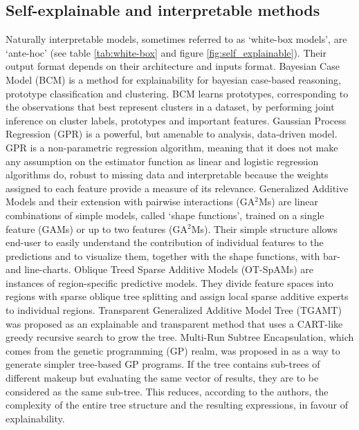 \documentclass[final,1p,times]{elsarticle}
\begin{document}
\subsection{Self-explainable and interpretable methods}
Naturally interpretable models, sometimes referred to as `white-box models', are `ante-hoc' (see table \ref{tab:white-box} and figure \ref{fig:self_explainable}). Their output format depends on their architecture and inputs format.
Bayesian Case Model (BCM) \cite{kim2014bayesian} is a method for explainability for bayesian case-based reasoning, prototype classification and clustering. BCM learns prototypes, corresponding to the observations that best represent clusters in a dataset, by performing joint inference on cluster labels, prototypes and important features.
Gaussian Process Regression (GPR) \cite{caywood2017gaussian} is a powerful, but amenable to analysis, data-driven model. GPR is a non-parametric regression algorithm, meaning that it does not make any assumption on the estimator function as linear and logistic regression algorithms do, robust to missing data and interpretable because the weights assigned to each feature provide a measure of its relevance.
Generalized Additive Models \cite{lou2012intelligible} and their extension with pairwise interactions (GA$^2$Ms) \cite{caruana2015intelligible, lou2013accurate} are linear combinations of simple models, called `shape functions', trained on a single feature (GAMs) or up to two features (GA$^2$Ms). Their simple structure allows end-user to easily understand the contribution of individual features to the predictions and to visualize them, together with the shape functions, with bar- and line-charts.
Oblique Treed Sparse Additive Models (OT-SpAMs) \cite{wang2015trading} are instances of region-specific predictive models. They divide feature spaces into regions with sparse oblique tree splitting and assign local sparse additive experts to individual regions. Transparent Generalized Additive Model Tree (TGAMT) \cite{fahner2018developing} was proposed as an explainable and transparent method that uses a CART-like greedy recursive search to grow the tree.
Multi-Run Subtree Encapsulation, which comes from the genetic programming (GP) realm, was proposed in \cite{howard2018explainable} as a way to generate simpler tree-based GP programs. If the tree contains sub-trees of different makeup but evaluating the same vector of results, they are to be considered as the same sub-tree. This reduces, according to the authors, the complexity of the entire tree structure and the resulting expressions, in favour of explainability.\\
\end{document}
